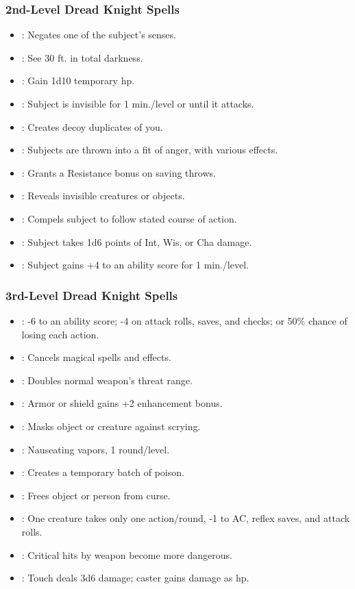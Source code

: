 \subsubsection{2nd-Level Dread Knight Spells}
\begin{itemize}
\item {}: Negates one of the subject's senses.
\item {}: See 30 ft. in total darkness.
\item {}: Gain 1d10 temporary hp.
\item {}: Subject is invisible for 1 min./level or until it attacks.
\item {}: Creates decoy duplicates of you.
\item {}: Subjects are thrown into a fit of anger, with various effects.
\item {}: Grants a Resistance bonus on saving throws.
\item {}: Reveals invisible creatures or objects.
\item {}: Compels subject to follow stated course of action.
\item {}: Subject takes 1d6 points of Int, Wis, or Cha damage.
\item {}: Subject gains +4 to an ability score for 1 min./level.
\end{itemize}
\subsubsection{3rd-Level Dread Knight Spells}
\begin{itemize}
\item {}: -6 to an ability score; -4 on attack rolls, saves, and checks; or 50\% chance of losing each action.
\item {}: Cancels magical spells and effects.
\item {}: Doubles normal weapon's threat range.
\item {}: Armor or shield gains +2 enhancement bonus.
\item {}: Masks object or creature against scrying.
\item {}: Nauseating vapors, 1 round/level.
\item {}: Creates a temporary batch of poison.
\item {}: Frees object or person from curse.
\item {}: One creature takes only one action/round, -1 to AC, reflex saves, and attack rolls.
\item {}: Critical hits by weapon become more dangerous.
\item {}: Touch deals 3d6 damage; caster gains damage as hp.
\end{itemize}
